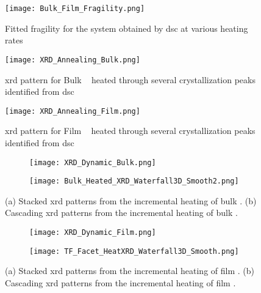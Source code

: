 \documentclass[a4paper,12pt,oneside]{article}%
\begin{document}
\begin{figure}[b]
	\centering
	\texttt{[image: Bulk\_Film\_Fragility.png]}
	\caption[Table of contents Capition]{Fitted fragility for the \MgZnCa system obtained by \acrshort{dsc} at various heating rates}
	\label{fig:Fragility_BulkFilm_mValue}
\end{figure}

\begin{figure}[b]
	\centering
	\texttt{[image: XRD\_Annealing\_Bulk.png]}
	\caption[Table of contents Capition]{\acrshort{xrd} pattern for Bulk \MgZnCa~ heated through several crystallization peaks identified from \acrshort{dsc}}
	\label{fig:XRD_Annealing_Bulk}
\end{figure}

\begin{figure}[b]
	\centering
	\texttt{[image: XRD\_Annealing\_Film.png]}
	\caption[Table of contents Capition]{\acrshort{xrd} pattern for Film \MgZnCa~ heated through several crystallization peaks identified from \acrshort{dsc}}
	\label{fig:XRD_Annealing_Film}
\end{figure}

\begin{figure}[b]
	\centering
	\begin{subfigure}[htbp]{0.75\textwidth}
		\texttt{[image: XRD\_Dynamic\_Bulk.png]}
		\caption{}
		\label{fig:XRD_Dynamic_FullStack_Bulk}
	\end{subfigure}
	\begin{subfigure}[htbp]{0.75\textwidth}
		\texttt{[image: Bulk\_Heated\_XRD\_Waterfall3D\_Smooth2.png]}
		\caption{}
		\label{fig:XRD_Dynamic_WaterFall_Bulk}
	\end{subfigure}
	\caption{(a) Stacked \gls{xrd} patterns from the incremental heating of bulk \MgZnCa. (b) Cascading \gls{xrd} patterns from the incremental heating of bulk \MgZnCa. }%
	\label{fig:XRD_Dynamic_Bulk}
\end{figure}

\begin{figure}[b]
	\centering
	\begin{subfigure}[htbp]{0.75\textwidth}
		\texttt{[image: XRD\_Dynamic\_Film.png]}
		\caption{}
		\label{fig:XRD_Dynamic_FullStack_Film}
	\end{subfigure}
	\begin{subfigure}[htbp]{0.75\textwidth}
		\texttt{[image: TF\_Facet\_HeatXRD\_Waterfall3D\_Smooth.png]}
		\caption{}
		\label{fig:XRD_Dynamic_WaterFall_Film}
	\end{subfigure}
	\caption{(a) Stacked \gls{xrd} patterns from the incremental heating of film \MgZnCa. (b) Cascading \gls{xrd} patterns from the incremental heating of film \MgZnCa. }%
	\label{fig:XRD_Dynamic_Film}
\end{figure}
\end{document}
